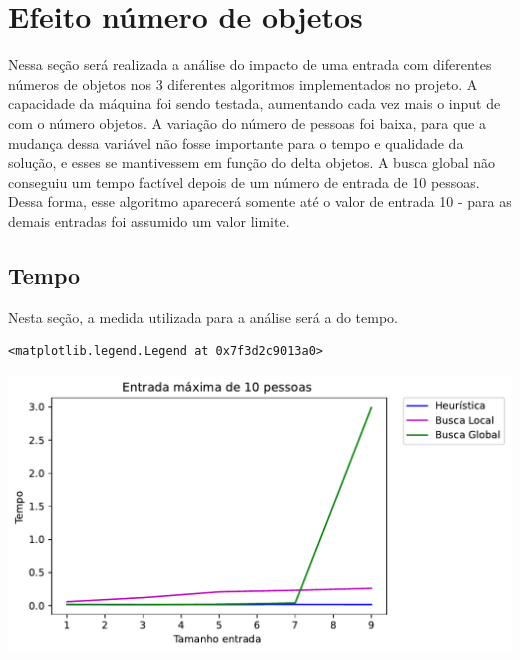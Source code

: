 \documentclass[a4paper,11pt,final]{article}
\begin{document}
\section{Efeito número de objetos}

Nessa seção será realizada a análise do impacto de uma entrada com diferentes números de objetos
nos 3 diferentes algoritmos implementados no projeto. A capacidade da máquina foi sendo testada,
aumentando cada vez mais o input de com o número objetos. A variação do número de pessoas foi baixa,
para que a mudança dessa variável não fosse importante para o tempo e qualidade da solução, e esses 
se mantivessem em função do delta objetos. A busca global não conseguiu um tempo factível depois 
de um número de entrada de 10 pessoas. Dessa forma, esse algoritmo aparecerá somente até o valor 
de entrada 10 - para as demais entradas foi assumido um valor limite. 




\subsection{Tempo}

Nesta seção, a medida utilizada para a análise será a do tempo.








\begin{verbatim}
<matplotlib.legend.Legend at 0x7f3d2c9013a0>
\end{verbatim}
\includegraphics[width= 15 cm]{figures/teste_figure10_1.pdf}
\end{document}
